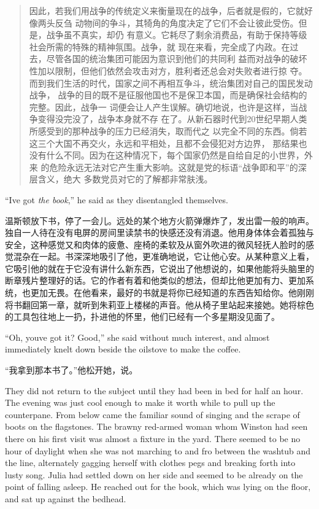 \begin{paracol}{2}
\begin{quotation}
因此，若我们用战争的传统定义来衡量现在的战争，后者就是假的，它就好像两头反刍
动物间的争斗，其犄角的角度决定了它们不会让彼此受伤。但是，战争虽不真实，却仍
有意义。它耗尽了剩余消费品，有助于保持等级社会所需的特殊的精神氛围。战争，就
现在来看，完全成了内政。在过去，尽管各国的统治集团可能因为意识到他们的共同利
益而对战争的破坏性加以限制，但他们依然会攻击对方，胜利者还总会对失败者进行掠
夺。而到我们生活的时代，国家之间不再相互争斗，统治集团对自己的国民发动战争，
战争的目的既不是征服他国也不是保卫本国，而是确保社会结构的完整。因此，战争一
词便会让人产生误解。确切地说，也许是这样，当战争变得没完没了，战争本身就不存
在了。从新石器时代到20世纪早期人类所感受到的那种战争的压力已经消失，取而代之
以完全不同的东西。倘若这三个大国不再交火，永远和平相处，且都不会侵犯对方边界，
那结果也没有什么不同。因为在这种情况下，每个国家仍然是自给自足的小世界，外来
的危险永远无法对它产生重大影响。这就是党的标语``战争即和平''的深层含义，绝大
多数党员对它的了解都非常肤浅。
\end{quotation}

\switchcolumn*

``I\textquotesingle ve got \emph{the book},'' he said as they disentangled
themselves.

\switchcolumn

温斯顿放下书，停了一会儿。远处的某个地方火箭弹爆炸了，发出雷一般的响声。独自一人待在没有电屏的房间里读禁书的快感还没有消退。他用身体体会着孤独与安全，这种感觉又和肉体的疲惫、座椅的柔软及从窗外吹进的微风轻抚人脸时的感觉混杂在一起。书深深地吸引了他，更准确地说，它让他心安。从某种意义上看，它吸引他的就在于它没有讲什么新东西，它说出了他想说的，如果他能将头脑里的断章残片整理好的话。它的作者有着和他类似的想法，但却比他更加有力、更加系统，也更加无畏。在他看来，最好的书就是将你已经知道的东西告知给你。他刚刚将书翻回第一章，就听到朱莉亚上楼梯的声音。他从椅子里站起来接她。她将棕色的工具包往地上一扔，扑进他的怀里，他们已经有一个多星期没见面了。

\switchcolumn*

``Oh, you\textquotesingle ve got it? Good,'' she said without much
interest, and almost immediately knelt down beside the oilstove to make
the coffee.

\switchcolumn

``我拿到那本书了。''他松开她，说。

\switchcolumn*

They did not return to the subject until they had been in bed for half
an hour. The evening was just cool enough to make it worth while to pull
up the counterpane. From below came the familiar sound of singing and
the scrape of boots on the flagstones. The brawny red-armed woman whom
Winston had seen there on his first visit was almost a fixture in the
yard. There seemed to be no hour of daylight when she was not marching
to and fro between the washtub and the line, alternately gagging herself
with clothes pegs and breaking forth into lusty song. Julia had settled
down on her side and seemed to be already on the point of falling
asleep. He reached out for the book, which was lying on the floor, and
sat up against the bedhead.


\end{paracol}
